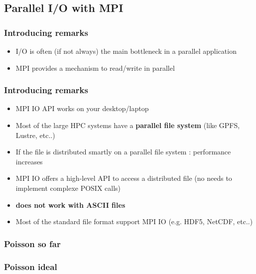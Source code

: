 \subsection{Parallel I/O with MPI}

\begin{frame}[containsverbatim]
\frametitle{Introducing remarks}
\begin{itemize}
	\item {I/O is often (if not always) the main bottleneck in a parallel application}
	\item {MPI provides a mechanism to read/write in parallel}
\end{itemize}

\begin{center}

\end{center}
\end{frame}


\begin{frame}[containsverbatim]
\frametitle{Introducing remarks}
\begin{itemize}
	\item {MPI IO API works on your desktop/laptop}
	\item {Most of the large HPC systems have a \textbf{parallel file system} (like GPFS, Lustre, etc..)}
	\item {If the file is distributed smartly on a parallel file system : performance increases}
	\item {MPI IO offers a high-level API to access a distributed file (no needs to implement complexe POSIX calls)}
	\item {\textbf{does not work with ASCII files}}
	\item {Most of the standard file format support MPI IO (e.g. HDF5, NetCDF, etc..)}
\end{itemize}
\end{frame}


\begin{frame}[containsverbatim]
\frametitle{Poisson so far}
\begin{center}

\end{center}
\end{frame}

\begin{frame}[containsverbatim]
\frametitle{Poisson ideal}
\begin{center}

\end{center}
\end{frame}


